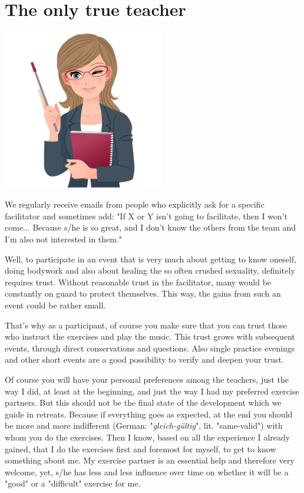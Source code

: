 \section{The only true teacher}

\begin{center}
\includegraphics[width=7cm]{images/14_teacher.png}
\end{center}

We regularly receive emails from people who explicitly ask for a specific facilitator and sometimes add: "If X or Y isn't going to facilitate, then I won't come... Because s/he is so great, and I don't know the others from the team and I'm also not interested in them."

Well, to participate in an event that is very much about getting to know oneself, doing bodywork and also about healing the so often crushed sexuality, definitely requires trust. Without reasonable trust in the facilitator, many would be constantly on guard to protect themselves. This way, the gains from such an event could be rather small.

That's why as a participant, of course you make sure that you can trust those who instruct the exercises and play the music. This trust grows with subsequent events, through direct conservations and questions. Also single practice evenings and other short events are a good possibility to verify and deepen your trust.

Of course you will have your personal preferences among the teachers, just the way I did, at least at the beginning, and just the way I had my preferred exercise partners. But this should not be the final state of the development which we guide in retreats. Because if everything goes as expected, at the end you should be more and more indifferent (German: "\textit{gleich-gültig}", lit. "same-valid") with whom you do the exercises. Then I know, based on all the experience I already gained, that I do the exercises first and foremost for myself, to get to know something about me. My exercise partner is an essential help and therefore very welcome, yet, s/he has less and less influence over time on whether it will be a "good" or a "difficult" exercise for me.

